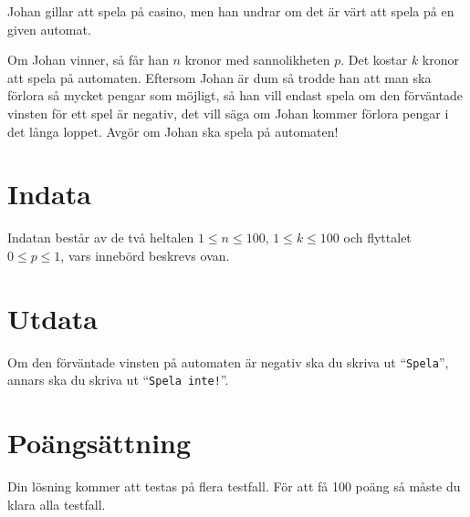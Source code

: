 

Johan gillar att spela på casino, men han undrar om det är värt att spela på en given automat. 

Om Johan vinner, så får han $n$ kronor med sannolikheten $p$.  Det kostar $k$ kronor att spela på automaten. Eftersom Johan är dum så trodde han att man ska förlora så mycket pengar som möjligt, så han vill endast spela om den förväntade vinsten för ett spel är negativ, det vill säga om Johan kommer förlora pengar i det långa loppet. Avgör om Johan ska spela på automaten!

\section*{Indata}
Indatan består av de två heltalen $1 \le n \le 100$, $1 \le k \le 100$ och flyttalet $0 \le p \le 1$, vars innebörd beskrevs ovan.

\section*{Utdata}
Om den förväntade vinsten på automaten är negativ ska du skriva ut ``\texttt{Spela}'', annars ska du skriva ut ``\texttt{Spela inte!}''.

\section*{Poängsättning}
Din lösning kommer att testas på flera testfall. För att få 100 poäng så måste du klara alla testfall.

